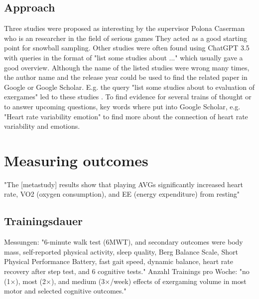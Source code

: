 \section{Approach}
Three studies were proposed as interesting by the supervisor Polona Caserman who is an researcher in the field of serious games They acted as a good starting point for snowball sampling.
Other studies were often found using ChatGPT 3.5 with queries in the format of "list some studies about ..." which usually gave a good overview. Although the name of the listed studies were wrong many times, the author name and the release year could be used to find the related paper in Google or Google Scholar. 
E.g. the query "list some studies about to evaluation of exergames" led to these studies \cite{fogel2010effects} \cite{lai2013effects}.
To find evidence for several trains of thought or to answer upcoming questions, key words where put into Google Scholar, e.g. "Heart rate variability emotion" to find more about the connection of heart rate variability and emotions.

\chapter{Measuring outcomes}
"The [metastudy] results show that playing AVGs significantly increased heart rate, VO2 (oxygen consumption), and EE (energy expenditure) from resting" \cite{peng2011playing}

\section{Trainingsdauer}
Messungen:
"6-minute walk test (6MWT), and secondary outcomes were
body mass, self-reported physical activity, sleep quality, Berg
Balance Scale, Short Physical Performance Battery, fast gait
speed, dynamic balance, heart rate recovery after step test,
and 6 cognitive tests."
Anzahl Trainings pro Woche: "no (1×), most (2×), and medium (3×/week) effects of exergaming volume in most motor and selected cognitive outcomes."
\cite{hortobagyi2012effects}

